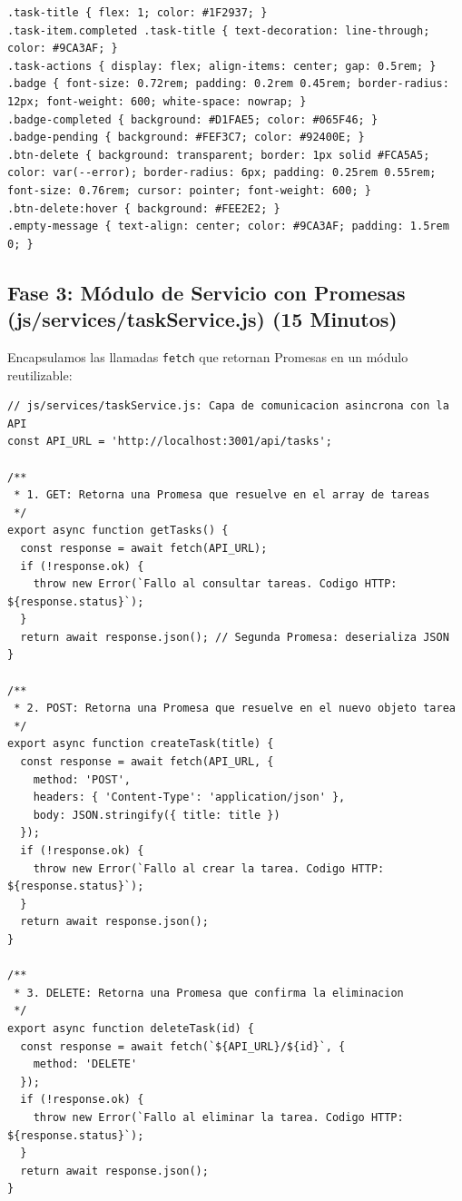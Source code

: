 \documentclass[10pt,letterpaper]{article}
\begin{document}
\begin{lstlisting}[style=bashstyle]
.task-title { flex: 1; color: #1F2937; }
.task-item.completed .task-title { text-decoration: line-through; color: #9CA3AF; }
.task-actions { display: flex; align-items: center; gap: 0.5rem; }
.badge { font-size: 0.72rem; padding: 0.2rem 0.45rem; border-radius: 12px; font-weight: 600; white-space: nowrap; }
.badge-completed { background: #D1FAE5; color: #065F46; }
.badge-pending { background: #FEF3C7; color: #92400E; }
.btn-delete { background: transparent; border: 1px solid #FCA5A5; color: var(--error); border-radius: 6px; padding: 0.25rem 0.55rem; font-size: 0.76rem; cursor: pointer; font-weight: 600; }
.btn-delete:hover { background: #FEE2E2; }
.empty-message { text-align: center; color: #9CA3AF; padding: 1.5rem 0; }
\end{lstlisting}

\subsection{Fase 3: Módulo de Servicio con Promesas (js/services/taskService.js) (15 Minutos)}
Encapsulamos las llamadas \texttt{fetch} que retornan Promesas en un módulo reutilizable:

\begin{lstlisting}[style=jsstyle]
// js/services/taskService.js: Capa de comunicacion asincrona con la API
const API_URL = 'http://localhost:3001/api/tasks';

/**
 * 1. GET: Retorna una Promesa que resuelve en el array de tareas
 */
export async function getTasks() {
  const response = await fetch(API_URL);
  if (!response.ok) {
    throw new Error(`Fallo al consultar tareas. Codigo HTTP: ${response.status}`);
  }
  return await response.json(); // Segunda Promesa: deserializa JSON
}

/**
 * 2. POST: Retorna una Promesa que resuelve en el nuevo objeto tarea
 */
export async function createTask(title) {
  const response = await fetch(API_URL, {
    method: 'POST',
    headers: { 'Content-Type': 'application/json' },
    body: JSON.stringify({ title: title })
  });
  if (!response.ok) {
    throw new Error(`Fallo al crear la tarea. Codigo HTTP: ${response.status}`);
  }
  return await response.json();
}

/**
 * 3. DELETE: Retorna una Promesa que confirma la eliminacion
 */
export async function deleteTask(id) {
  const response = await fetch(`${API_URL}/${id}`, {
    method: 'DELETE'
  });
  if (!response.ok) {
    throw new Error(`Fallo al eliminar la tarea. Codigo HTTP: ${response.status}`);
  }
  return await response.json();
}
\end{lstlisting}
\end{document}
